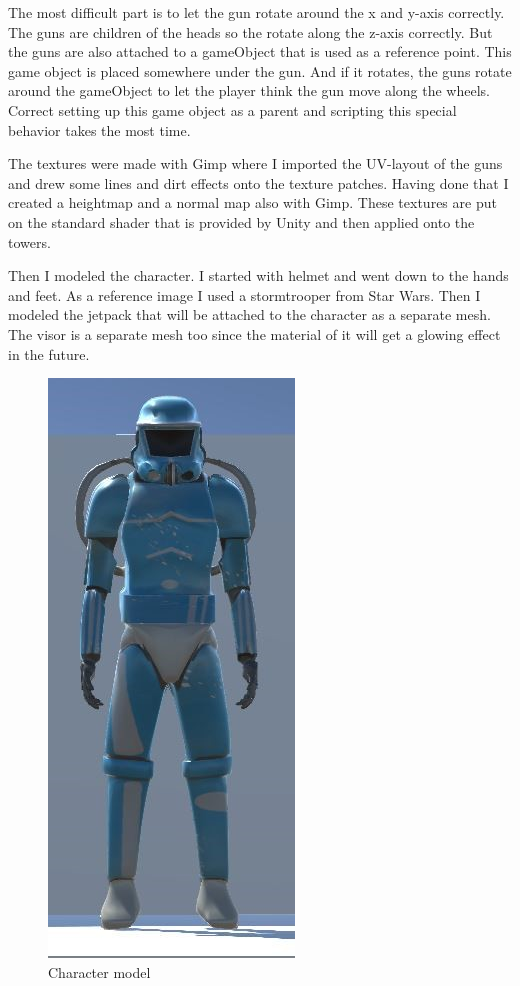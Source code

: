 \documentclass[12pt, letterpaper]{scrartcl}
\begin{document}
	The most difficult part is to let the gun rotate around the x and y-axis correctly. The guns are children of the heads so the rotate along the z-axis correctly. But the guns are also attached to a gameObject that is used as a reference point. This game object is placed somewhere under the gun. And if it rotates, the guns rotate around the gameObject to let the player think the gun move along the wheels. Correct setting up this game object as a parent and scripting this special behavior takes the most time.
	
	The textures were made with Gimp where I imported the UV-layout of the guns and drew some lines and dirt effects onto the texture patches. Having done that I created a heightmap and a normal map also with Gimp. These textures are put on the standard shader that is provided by Unity and then applied onto the towers.
	
	Then I modeled the character. I started with helmet and went down to the hands and feet. As a reference image I used a stormtrooper from Star Wars. Then I modeled the jetpack that will be attached to the character as a separate mesh. The visor is a separate mesh too since the material of it will get a glowing effect in the future.
	
	\begin{figure}[H]
		\centering
		\includegraphics[scale=0.9]{images//interim/character}
		\caption{Character model}
	\end{figure}
	
\end{document}
